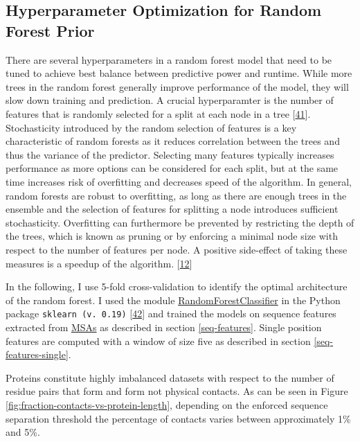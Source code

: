 \documentclass[12pt,a4paper,twoside]{book}
\theoremstyle{definition}
\theoremstyle{definition}
\theoremstyle{remark}
\begin{document}
\subsection{Hyperparameter Optimization for Random Forest
Prior}\label{rf-hyperparameter-optimization}

There are several hyperparameters in a random forest model that need to
be tuned to achieve best balance between predictive power and runtime.
While more trees in the random forest generally improve performance of
the model, they will slow down training and prediction. A crucial
hyperparamter is the number of features that is randomly selected for a
split at each node in a tree
{[}\protect\hyperlink{ref-Bernard2009}{41}{]}. Stochasticity introduced
by the random selection of features is a key characteristic of random
forests as it reduces correlation between the trees and thus the
variance of the predictor. Selecting many features typically increases
performance as more options can be considered for each split, but at the
same time increases risk of overfitting and decreases speed of the
algorithm. In general, random forests are robust to overfitting, as long
as there are enough trees in the ensemble and the selection of features
for splitting a node introduces sufficient stochasticity. Overfitting
can furthermore be prevented by restricting the depth of the trees,
which is known as pruning or by enforcing a minimal node size with
respect to the number of features per node. A positive side-effect of
taking these measures is a speedup of the algorithm.
{[}\protect\hyperlink{ref-Louppe2014}{12}{]}

In the following, I use 5-fold cross-validation to identify the optimal
architecture of the random forest. I used the module
\href{http://scikit-learn.org/stable/modules/generated/sklearn.ensemble.RandomForestClassifier.html\#sklearn.ensemble.RandomForestClassifier}{RandomForestClassifier}
in the Python package \texttt{sklearn\ (v.\ 0.19)}
{[}\protect\hyperlink{ref-Pedregosa2011}{42}{]} and trained the models
on sequence features extracted from \protect\hyperlink{abbrev}{MSAs} as
described in section \ref{seq-features}. Single position features are
computed with a window of size five as described in section
\ref{seq-features-single}.

Proteins constitute highly imbalanced datasets with respect to the
number of residue pairs that form and form not physical contacts. As can
be seen in Figure \ref{fig:fraction-contacts-vs-protein-length},
depending on the enforced sequence separation threshold the percentage
of contacts varies between approximately 1\% and 5\%.
\end{document}
